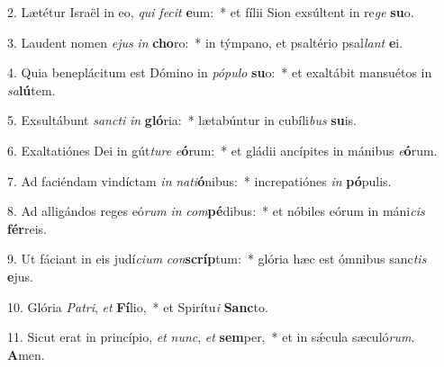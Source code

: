 2. Lætétur Israël in eo, \textit{qui} \textit{fe}\textit{cit} \textbf{e}um:~*  et fílii Sion exsúltent in re\textit{ge} \textbf{su}o.\

3. Laudent nomen \textit{e}\textit{jus} \textit{in} \textbf{cho}ro:~*  in týmpano, et psaltério psal\textit{lant} \textbf{e}i.\

4. Quia beneplácitum est Dómino in \textit{pó}\textit{pu}\textit{lo} \textbf{su}o:~*  et exaltábit mansuétos in \textit{sa}\textbf{lú}tem.\

5. Exsultábunt \textit{sanc}\textit{ti} \textit{in} \textbf{gló}ria:~*  lætabúntur in cubíli\textit{bus} \textbf{su}is.\

6. Exaltatiónes Dei in gút\textit{tu}\textit{re} \textit{e}\textbf{ó}rum:~*  et gládii ancípites in mánibus \textit{e}\textbf{ó}rum.\

7. Ad faciéndam vindíctam \textit{in} \textit{na}\textit{ti}\textbf{ó}nibus:~*  increpatiónes \textit{in} \textbf{pó}pulis.\

8. Ad alligándos reges eó\textit{rum} \textit{in} \textit{com}\textbf{pé}dibus:~*  et nóbiles eórum in máni\textit{cis} \textbf{fér}reis.\

9. Ut fáciant in eis judí\textit{ci}\textit{um} \textit{con}\textbf{scríp}tum:~*  glória hæc est ómnibus sanc\textit{tis} \textbf{e}jus.\

10. Glória \textit{Pa}\textit{tri}, \textit{et} \textbf{Fí}lio,~*  et Spirítu\textit{i} \textbf{Sanc}to.\

11. Sicut erat in princípio, \textit{et} \textit{nunc}, \textit{et} \textbf{sem}per,~*  et in sǽcula sæculó\textit{rum}. \textbf{A}men.\

